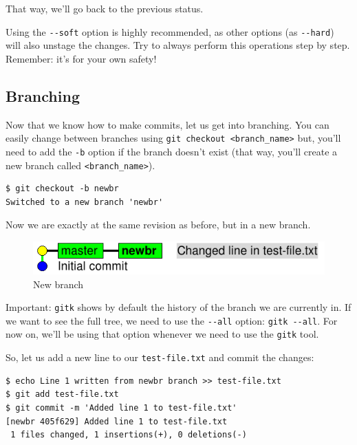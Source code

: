 \documentclass[a4paper,10pt]{article}
\newenvironment{terminal}
  {
    \vspace{+10pt}
    \begin{center}
    \begin{minipage}{0.95\textwidth}
    \begin{framed}
  }
  {
    \end{framed}
    \end{minipage}
    \end{center}
    \vspace{+10pt}
  }
\begin{document}
That way, we'll go back to the previous status.

\begin{tip}
Using the \texttt{-{}-soft} option is highly recommended, as other
options (as \texttt{-{}-hard}) will also unstage the changes. Try to
always perform this operations step by step. Remember: it's for your
own safety!
\end{tip}

\subsection{Branching}

Now that we know how to make commits, let us get into branching. You can
easily change between branches using
\texttt{git checkout <branch\_name>}
but, you'll need to add the \texttt{-b} option if the branch doesn't
exist (that way, you'll create a new branch called
\texttt{<branch\_name>}).

\begin{terminal}
\begin{verbatim}
$ git checkout -b newbr
Switched to a new branch 'newbr'
\end{verbatim}
\end{terminal}

Now we are exactly at the same revision as before, but in a new branch.

\begin{figure}[h]
  \begin{center}
    \includegraphics[scale=0.5]{git_example-04}
  \end{center}
  \caption{New branch}
\end{figure}

\begin{tip}
Important: \texttt{gitk} shows by default the history of the branch we
are currently in. If we want to see the full tree, we need to use the
\texttt{-{}-all} option: \texttt{gitk -{}-all}. For now on, we'll be
using that option whenever we need to use the \texttt{gitk} tool.
\end{tip}

So, let us add a new line to our \texttt{test-file.txt} and commit the
changes:

\begin{terminal}
\begin{verbatim}
$ echo Line 1 written from newbr branch >> test-file.txt
$ git add test-file.txt
$ git commit -m 'Added line 1 to test-file.txt'
[newbr 405f629] Added line 1 to test-file.txt
 1 files changed, 1 insertions(+), 0 deletions(-)
\end{verbatim}
\end{terminal}
\end{document}
